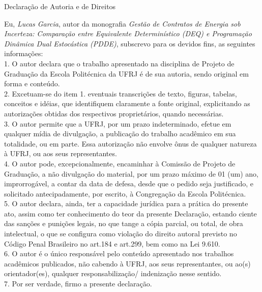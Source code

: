 \begin{center}
Declara\c{c}\~ao de Autoria e de Direitos
\end{center}

\vspace{0.5cm}

Eu, \emph{Lucas Garcia}, autor da monografia \emph{Gest\~ao de Contratos de Energia sob Incerteza: Compara\c{c}\~ao entre Equivalente Determin\'istico (DEQ) e Programa\c{c}\~ao Din\^amica Dual Estoc\'astica (PDDE)}, subscrevo para os devidos fins, as seguintes informa\c{c}\~oes:\\
1. O autor declara que o trabalho apresentado na disciplina de Projeto de Gradua\c{c}\~ao da Escola Polit\'ecnica da UFRJ \'e de sua autoria, sendo original em forma e conte\'udo.\\
2. Excetuam-se do item 1. eventuais transcri\c{c}\~oes de texto, figuras, tabelas, conceitos e id\'eias, que identifiquem claramente a fonte original, explicitando as autoriza\c{c}\~oes obtidas dos respectivos propriet\'arios, quando necess\'arias.\\
3. O autor permite que a UFRJ, por um prazo indeterminado, efetue em qualquer m\'idia de divulga\c{c}\~ao, a publica\c{c}\~ao do trabalho acad\^emico em sua totalidade, ou em parte. Essa autoriza\c{c}\~ao n\~ao envolve \^onus de qualquer natureza \`a UFRJ, ou aos seus representantes.\\
4. O autor pode, excepcionalmente, encaminhar \`a Comiss\~ao de Projeto de Gradua\c{c}\~ao, a n\~ao divulga\c{c}\~ao do material, por um prazo m\'aximo de 01 (um) ano, improrrog\'avel, a contar da data de defesa, desde que o pedido seja justificado, e solicitado antecipadamente, por escrito, \`a Congrega\c{c}\~ao da Escola Polit\'ecnica.\\
5. O autor declara, ainda, ter a capacidade jur\'idica para a pr\'atica do presente ato, assim como ter conhecimento do teor da presente Declara\c{c}\~ao, estando ciente das san\c{c}\~oes e puni\c{c}\~oes legais, no que tange a c\'opia parcial, ou total, de obra intelectual, o que se configura como viola\c{c}\~ao do direito autoral previsto no C\'odigo Penal Brasileiro no art.184 e art.299, bem como na Lei 9.610.\\
6. O autor \'e o \'unico respons\'avel pelo conte\'udo apresentado nos trabalhos acad\^emicos publicados, n\~ao cabendo \`a UFRJ, aos seus representantes, ou ao(s) orientador(es), qualquer responsabiliza\c{c}\~ao/ indeniza\c{c}\~ao nesse sentido.\\
7. Por ser verdade, firmo a presente declara\c{c}\~ao.\\


